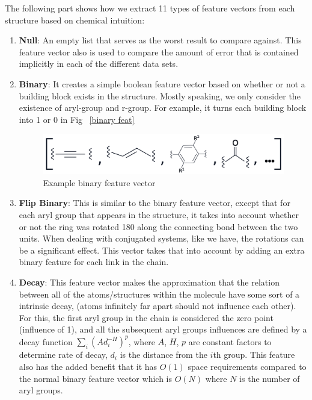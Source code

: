 The following part shows how we extract 11 types of feature vectors from each structure based on chemical intuition:

\begin{enumerate}
\item \textbf{Null}: An empty list that serves as the worst result to compare against. This feature vector also is used to compare the amount of error that is contained implicitly in each of the different data sets.

\item \textbf{Binary}: It creates a simple boolean feature vector based on whether or not a building block exists in the structure. Mostly speaking, we only consider the existence of aryl-group and r-group. For example, it turns each building block into 1 or 0 in Fig ~\ref{binary feat}

\begin{figure}[hb]
\begin{center}
\includegraphics [width=1\textwidth]{binaryfeat.png}
\caption{Example binary feature vector}\label{binaryfeat}
\end{center}
\end{figure}

\item \textbf{Flip Binary}: This is similar to the binary feature vector, except that for each aryl group that appears in the structure, it takes into account whether or not the ring was rotated 180 along the connecting bond between the two units. When dealing with conjugated systems, like we have, the rotations can be a significant effect. This vector takes that into account by adding an extra binary feature for each link in the chain.

\item \textbf{Decay}: This feature vector makes the approximation that the relation between all of the atoms/structures within the molecule have some sort of a intrinsic decay, (atoms infinitely far apart should not influence each other). For this, the first aryl group in the chain is considered the zero point (influence of 1), and all the subsequent aryl groups influences are defined by a decay function $\sum_{i} (Ad_{i}^{-H})^{p}$, where $A$, $H$, $p$ are constant factors to determine rate of decay, $d_{i}$ is the distance from the $i$th group. This feature also has the added benefit that it has $O(1)$ space requirements compared to the normal binary feature vector which is $O(N)$ where $N$ is the number of aryl groups.


\end{enumerate}
